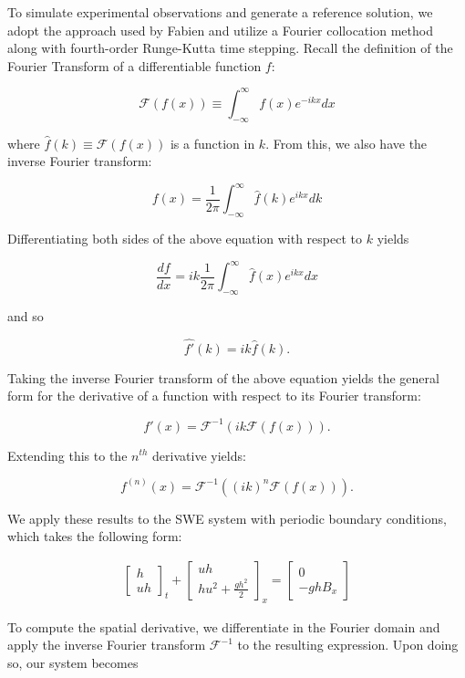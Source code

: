 To simulate experimental observations and generate a reference solution, we adopt the approach used by Fabien \cite{fabien2014spectral} and utilize a Fourier collocation method along 
with fourth-order Runge-Kutta time stepping. Recall the definition of the Fourier Transform of a differentiable function 
$f$:

$$
\mathcal{F}(f(x)) \equiv \int_{-\infty}^{\infty}f(x)e^{-ikx}dx
$$

where $\hat{f}(k) \equiv \mathcal{F}(f(x))$ is a function in $k$. From this, we also have the inverse Fourier transform:

$$
f(x) = \frac{1}{2\pi}\int_{-\infty}^{\infty} \hat{f}(k)e^{ikx}dk
$$

\noindent Differentiating both sides of the above equation with respect to $k$ yields

$$
\frac{df}{dx} = ik\frac{1}{2\pi}\int_{-\infty}^{\infty}\hat{f}(x)e^{ikx}dx
$$

\noindent and so

$$
\hat{f'}(k) = ik\hat{f}(k).
$$

Taking the inverse Fourier transform of the above equation yields the general form for the derivative of a function with 
respect to its Fourier transform:

$$
f'(x) = \mathcal{F}^{-1}(ik\mathcal{F}(f(x))).
$$

\noindent Extending this to the $n^{th}$ derivative yields:

$$
f^{(n)}(x) = \mathcal{F}^{-1}((ik)^n\mathcal{F}(f(x))).
$$

We apply these results to the SWE system with periodic boundary conditions, which takes the following form:

\begin{align*}
    \begin{bmatrix}
        h\\
        uh
    \end{bmatrix}_t
    + 
    \begin{bmatrix}
        uh\\
        hu^2 + \frac{gh^2}{2}
    \end{bmatrix}_x
    =
    \begin{bmatrix}
        0\\
        -ghB_x
    \end{bmatrix}
\end{align*}    

To compute the spatial derivative, we differentiate in the Fourier domain and apply the inverse Fourier transform 
$\mathcal{F}^{-1}$ to the resulting expression. Upon doing so, our system becomes


